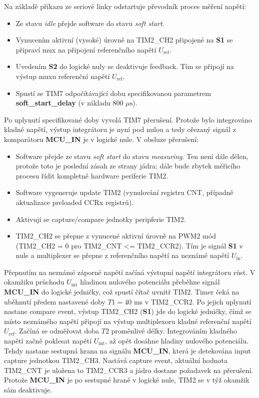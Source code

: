 \documentclass[twoside]{article}
\begin{document}
Na základě příkazu ze seriové linky odstartuje převodník proces měření napětí:
\begin{itemize}
    \item Ze stavu \textit{idle} přejde software do stavu \textit{soft start}.
    \item Vynucením aktivní (vysoké) úrovně na TIM2\_CH2 připojené na \textbf{S1} se připraví mux na připojení referenčního napětí $U_{\text{ref}}$.
    \item Uvedením \textbf{S2} do logické nuly se deaktivuje feedback. Tím se připojí na výstup muxu referenční napětí $U_{\text{ref}}$.
    \item Spustí se TIM7 odpočítávající dobu specifikovanou parametrem \textbf{soft\_start\_delay} (v základu 800 $\mu\text{s}$).
\end{itemize}

Po uplynutí specifikované doby vyvolá TIM7 přerušení. Protože bylo integrováno kladné napětí, výstup integrátoru je nyní pod nulou a tedy ořezaný signál z komparátoru
\textbf{MCU\_IN} je v logické nule. V obsluze přerušení:
\begin{itemize}
    \item Software přejde ze stavu \textit{soft start} do stavu \textit{measuring}.
    Ten není dále dělen, protože toto je poslední zásah ze strany jádra; dále bude zbytek měřicího procesu řídit kompletně hardware periferie TIM2.
    \item Software vygeneruje update TIM2 (vynulování registru CNT, případně aktualizace preloaded CCRx registrů).
    \item Aktivují se capture/compare jednotky peripferie TIM2.
    \item TIM2\_CH2 se přepne z vynucené aktivní úrovně na PWM2 mód (TIM2\_CH2 = 0 pro TIM2\_CNT <= TIM2\_CCR2).
    Tím je signál \textbf{S1} v nule a multiplexer se přepne z referenčního napětí na neznámé napětí $U_{\text{in}}$.
\end{itemize}
Přepnutím na neznámé záporné napětí začíná výstupní napětí integrátoru růst. V okamžiku průchodu $U_{\text{int}}$ hladinou nulového potenciálu přeběhne signál \textbf{MCU\_IN}
do logické jedničky, což spustí čítač uvnitř TIM2. Timer čeká na uběhnutí předem nastavené doby $T1 = 40$ ms v TIM2\_CCR2. Po jejich uplynutí nastane compare event,
výstup TIM2\_CH2 (\textbf{S1}) jde do logické jedničky, čímž se místo neznámého napětí připojí na výstup multiplexoru kladné referenční napětí $U_{\text{ref}}$.
Začíná se odměřovat doba $T2$ proměnlivé délky.
Integrováním kladného napětí začně poklesat napětí $U_{\text{int}}$, až opět dosáhne hladiny nulového potenciálu. Tehdy nastane sestupná hrana na signálu \textbf{MCU\_IN}, která
je detekována input capture jednotkou TIM2\_CH3. Nastává capture event, aktuální hodnota TIM2\_CNT je uložena to TIM2\_CCR3 a jádro dostane požadavek na přerušení.
Protože \textbf{MCU\_IN} je po sestupné hraně v logické nule, TIM2 se v týž okamžik sám deaktivuje.
\end{document}
